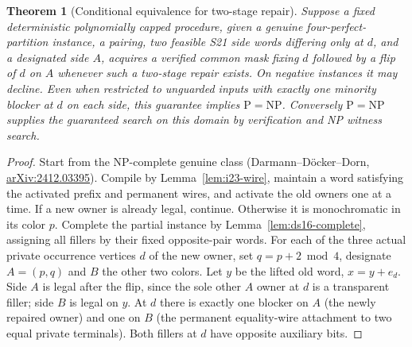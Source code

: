 \documentclass[11pt]{article}
\newtheorem{theorem}{Theorem}
\begin{document}
\begin{theorem}[Conditional equivalence for two-stage repair]\label{thm:i23-mask}
Suppose a fixed deterministic polynomially capped procedure, given a genuine four-perfect-partition instance, a pairing, two feasible S21 side words differing only at $d$, and a designated side $A$, acquires a verified common mask fixing $d$ followed by a flip of $d$ on $A$ whenever such a two-stage repair exists. On negative instances it may decline. Even when restricted to unguarded inputs with exactly one minority blocker at $d$ on each side, this guarantee implies $\mathrm P=\mathrm{NP}$. Conversely $\mathrm P=\mathrm{NP}$ supplies the guaranteed search on this domain by verification and NP witness search.
\end{theorem}
\begin{proof}
Start from the NP-complete genuine class (Darmann--D\"ocker--Dorn, \href{https://arxiv.org/abs/2412.03395}{arXiv:2412.03395}). Compile by Lemma~\ref{lem:i23-wire}, maintain a word satisfying the activated prefix and permanent wires, and activate the old owners one at a time. If a new owner is already legal, continue. Otherwise it is monochromatic in its color $p$. Complete the partial instance by Lemma~\ref{lem:ds16-complete}, assigning all fillers by their fixed opposite-pair words. For each of the three actual private occurrence vertices $d$ of the new owner, set $q=p+2\bmod4$, designate $A=(p,q)$ and $B$ the other two colors. Let $y$ be the lifted old word, $x=y+e_d$. Side $A$ is legal after the flip, since the sole other $A$ owner at $d$ is a transparent filler; side $B$ is legal on $y$. At $d$ there is exactly one blocker on $A$ (the newly repaired owner) and one on $B$ (the permanent equality-wire attachment to two equal private terminals). Both fillers at $d$ have opposite auxiliary bits.


\end{proof}
\end{document}
